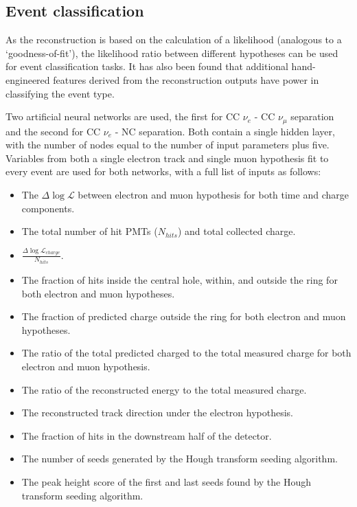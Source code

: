 \subsection{Event classification}%
\label{sec:cvn_old_pid} %

As the reconstruction is based on the calculation of a likelihood (analogous to a
`goodness-of-fit'), the likelihood ratio between different hypotheses can be used for event
classification tasks. It has also been found that additional hand-engineered features derived from
the reconstruction outputs have power in classifying the event type.

Two artificial neural networks are used, the first for CC $\nu_{e}$ - CC $\nu_{\mu}$ separation
and the second for CC $\nu_{e}$ - NC separation. Both contain a single hidden layer, with the
number of nodes equal to the number of input parameters plus five. Variables from both a single
electron track and single muon hypothesis fit to every event are used for both networks, with a
full list of inputs as follows:
\begin{itemize}
    \item The $\Delta\log\mathcal{L}$ between electron and muon hypothesis for both time and
          charge components.
    \item The total number of hit PMTs ($N_{hits}$) and total collected charge.
    \item $\frac{\Delta\log\mathcal{L}_{charge}}{N_{hits}}$.
    \item The fraction of hits inside the central hole, within, and outside the ring for both
          electron and muon hypotheses.
    \item The fraction of predicted charge outside the ring for both electron and muon hypotheses.
    \item The ratio of the total predicted charged to the total measured charge for both electron
          and muon hypothesis.
    \item The ratio of the reconstructed energy to the total measured charge.
    \item The reconstructed track direction under the electron hypothesis.
    \item The fraction of hits in the downstream half of the detector.
    \item The number of seeds generated by the Hough transform seeding algorithm.
    \item The peak height score of the first and last seeds found by the Hough transform seeding
          algorithm.
\end{itemize}

